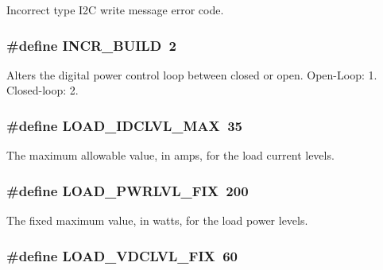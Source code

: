 Incorrect type I2\-C write message error code. \hypertarget{a00043_abf493281a7e64fe88660c38753e18d56}{
\subsubsection[{I\-N\-C\-R\-\_\-\-B\-U\-I\-L\-D}]{\setlength{\rightskip}{0pt plus 5cm}\#define I\-N\-C\-R\-\_\-\-B\-U\-I\-L\-D~2}}\label{a00043_abf493281a7e64fe88660c38753e18d56}
Alters the digital power control loop between closed or open. Open-\/\-Loop\-: 1. Closed-\/loop\-: 2. \hypertarget{a00043_a1dd2b3b31e620e021371603376c6980f}{
\subsubsection[{L\-O\-A\-D\-\_\-\-I\-D\-C\-L\-V\-L\-\_\-\-M\-A\-X}]{\setlength{\rightskip}{0pt plus 5cm}\#define L\-O\-A\-D\-\_\-\-I\-D\-C\-L\-V\-L\-\_\-\-M\-A\-X~35}}\label{a00043_a1dd2b3b31e620e021371603376c6980f}
The maximum allowable value, in amps, for the load current levels. \hypertarget{a00043_aea1e2f7c212899b68d0cb6f4fcd1683d}{
\subsubsection[{L\-O\-A\-D\-\_\-\-P\-W\-R\-L\-V\-L\-\_\-\-F\-I\-X}]{\setlength{\rightskip}{0pt plus 5cm}\#define L\-O\-A\-D\-\_\-\-P\-W\-R\-L\-V\-L\-\_\-\-F\-I\-X~200}}\label{a00043_aea1e2f7c212899b68d0cb6f4fcd1683d}
The fixed maximum value, in watts, for the load power levels. \hypertarget{a00043_ac460f1e706fdf51002f5dfc15c8eb5c9}{
\subsubsection[{L\-O\-A\-D\-\_\-\-V\-D\-C\-L\-V\-L\-\_\-\-F\-I\-X}]{\setlength{\rightskip}{0pt plus 5cm}\#define L\-O\-A\-D\-\_\-\-V\-D\-C\-L\-V\-L\-\_\-\-F\-I\-X~60}}\label{a00043_ac460f1e706fdf51002f5dfc15c8eb5c9}
